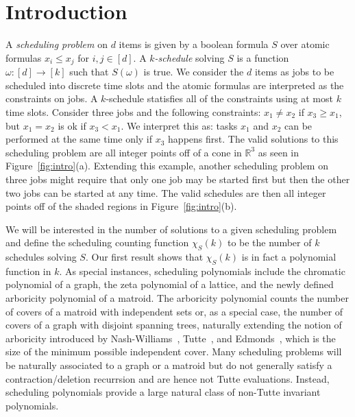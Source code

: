 \documentclass[12pt,reqno]{amsart}
\numberwithin{definition}{section}
\theoremstyle{definition}
\newcommand{\defn}[1]{\emph{#1}}
\newcommand{\poly}{\chi} %
\begin{document}

\section{Introduction}



A \defn{scheduling problem} on $d$ items is given by a boolean
formula $S$ over atomic formulas $x_i\leq x_j$ for
$i,j\in[d]$. A \defn{$k$-schedule} solving $S$ is a function
$\omega:[d]\rightarrow[k]$ such that $S(\omega)$ is true.  We
consider the $d$ items as jobs to be scheduled into discrete time
slots and the atomic formulas are interpreted as the constraints on
jobs.  A $k$-schedule statisfies all of the constraints using at most
$k$ time slots.  Consider three jobs and the following constraints:
$x_1 \neq x_2$ if $ x_3 \geq x_1$, but $x_1 = x_2$ is ok if $x_3 <
x_1$.  We interpret this as: tasks $x_1$ and $x_2$
can be performed at the same time only if $x_3$ happens first.  The valid solutions to this scheduling problem are all integer points off of a cone in $\mathbb{R}^3$ as seen in Figure~\ref{fig:intro}(a).   Extending this example, another scheduling problem on three jobs might require that only one job may be started first but then the other two jobs can be started at any time.  The valid schedules are then all integer points off of the shaded regions in Figure~\ref{fig:intro}(b).

We will be interested in the number of solutions to a given scheduling
problem and define the scheduling counting function $\poly_S(k)$ to be
the number of $k$ schedules solving $S$.  Our first result shows that
$\poly_S(k)$ is in fact a polynomial function in $k$.  As special
instances, scheduling polynomials include the chromatic polynomial of
a graph, the zeta polynomial of a lattice, and the newly defined
arboricity polynomial of a matroid. The arboricity polynomial counts
the number of covers of a matroid with independent sets or, as a
special case, the number of covers of a graph with disjoint spanning
trees, naturally extending the notion of arboricity introduced by
Nash-Williams~\cite{Nash}, Tutte~\cite{Tutte}, and Edmonds~\cite{Edmonds}, which is the size of the minimum
possible independent cover.
 Many scheduling problems will be naturally associated to
a graph or a matroid but do not generally satisfy a
contraction/deletion recurrsion and are hence not Tutte evaluations.
Instead, scheduling polynomials provide a large natural class of
non-Tutte invariant polynomials.
\end{document}
